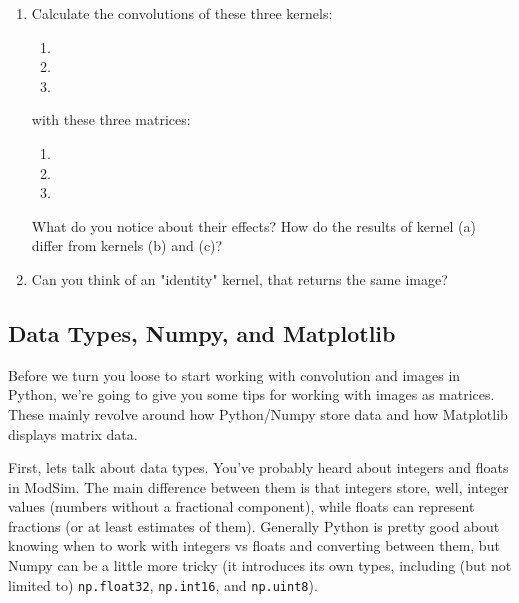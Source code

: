 \documentclass{tufte-handout}
\begin{document}
\begin{enumerate}[series=exercises, label=\textbf{Exercise} (\arabic*)]
\item Calculate the convolutions of these three kernels:
    \begin{enumerate}
        \item {}
        \item {}
        \item {}
    \end{enumerate}
    with these three matrices:
    \begin{enumerate}
        \item {}
        \item {}
        \item {}
    \end{enumerate}
    What do you notice about their effects? How do the results of kernel (a)
    differ from kernels (b) and (c)?
\item Can you think of an "identity" kernel, that returns the same image?
\end{enumerate}

\subsection{Data Types, Numpy, and Matplotlib}

Before we turn you loose to start working with convolution and images in Python, we're going to give you some tips for working with images as matrices. These mainly revolve around how Python/Numpy store data and how Matplotlib displays matrix data.

First, lets talk about data types. You've probably heard about integers and floats in ModSim. The main difference between them is that integers store, well, integer values (numbers without a fractional component), while floats can represent fractions (or at least estimates of them). Generally Python is pretty good about knowing when to work with integers vs floats and converting between them, but Numpy can be a little more tricky (it introduces its own types, including (but not limited to) \lstinline{np.float32}, \lstinline{np.int16}, and \lstinline{np.uint8}).
\end{document}
